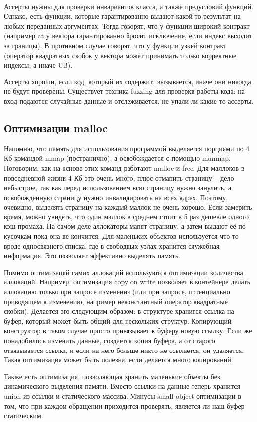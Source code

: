 \documentclass[12pt, a4paper]{article}
\begin{document}
	\\\par Ассерты нужны для проверки инвариантов класса, а также предусловий функций. Однако, есть функции, которые гарантированно выдают какой-то результат на любых переданных аргументах. Тогда говорят, что у функции широкий контракт (например at у вектора гарантированно бросит исключение, если индекс выходит за границы). В противном случае говорят, что у функции узкий контракт (оператор квадратных скобок у вектора может принимать только корректные индексы, а иначе UB).
	\\\par Ассерты хороши, если код, который их содержит, вызывается, иначе они никогда не будут проверены. Существует техника fuzzing для проверки работы кода: на вход подаются случайные данные и отслеживается, не упали ли какие-то ассерты.
	\subsection{Оптимизации malloc}
	Напомню, что память для использования программой выделяется порциями по 4 Кб командой mmap (постранично), а освобождается с помощью munmap. Поговорим, как на основе этих команд работают malloc и free. Для маллоков в повседневной жизни 4 Кб это очень много, плюс отмапить страницу -- дело небыстрое, так как перед использованием всю страницу нужно занулить, а освобожденную страницу нужно инвалидировать на всех ядрах. Поэтому, очевидно, выделять страницу на каждый маллок не очень хорошо. Если замерить время, можно увидеть, что один маллок в среднем стоит в 5 раз дешевле одного кэш-промаха. На самом деле аллокаторы мапят страницу, а затем выдают её по кусочкам пока она не кончится. Для маленьких объектов используется что-то вроде односвязного списка, где в свободных узлах хранится служебная информация. Это позволяет эффективно выделять память.
	\\\par Помимо оптимизаций самих аллокаций используются оптимизации количества аллокаций. Например, оптимизация copy on write позволяет в контейнере делать аллокацию только при запросе изменения (или при запросе, потенциально приводящем к изменению, например неконстантный оператор квадратные скобки). Делается это следующим образом: в структуре хранится ссылка на буфер, который может быть общий для нескольких структур. Копирующий конструктор в таком случае просто привязывает к буферу новую ссылку. Если же понадобилось изменить данные, создается копия буфера, а от старого отвязывается ссылка, и если на него больше никто не ссылается, он удаляется. Такая оптимизация может быть полезна, если делается много копирований.
	\par Также есть оптимизация, позволяющая хранить маленькие объекты без динамического выделения памяти. Вместо ссылки на данные теперь хранится union из ссылки и статического массива. Минусы small object оптимизации в том, что при каждом обращении приходится проверять, является ли наш буфер статическим.
\end{document}
